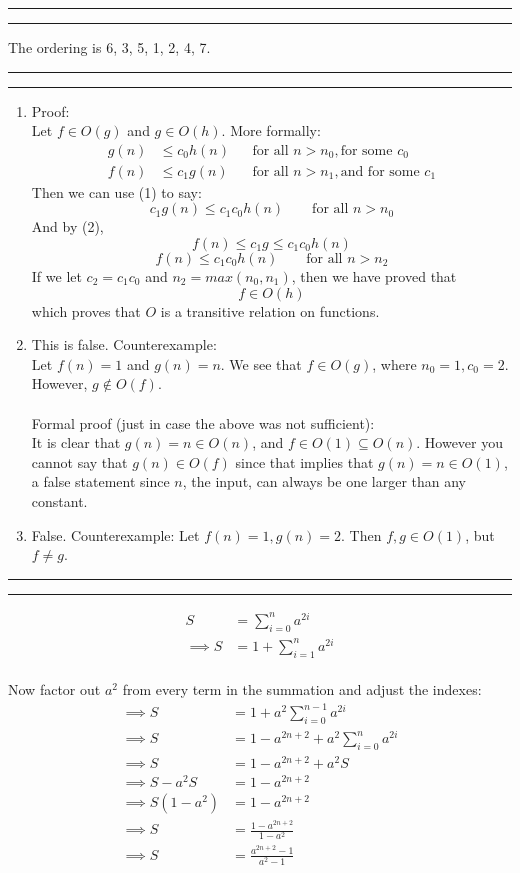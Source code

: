 \documentclass[11pt,letterpaper]{article}
\newcommand{\question}[2] {\vspace{.25in} \hrule\vspace{0.5em}
\noindent{\bf #1: #2} \vspace{0.5em}
\hrule \vspace{.10in}}
\begin{document}
%
%

\question{6}{Task 4.1}
The ordering is 6, 3, 5, 1, 2, 4, 7.

\question{7}{Task 4.2}
\begin{enumerate}
  \item
    Proof: \\
    Let $f \in O(g)$ and $g \in O(h)$. More formally:
    \begin{align}
      g(n) &\leq c_0 h(n) && \text{for all } n > n_0,\text{for some }c_0 \\
      f(n) &\leq c_1 g(n) && \text{for all } n > n_1,\text{and for some }c_1
    \end{align}
    Then we can use (1) to say:
    $$ c_1 g(n) \leq c_1 c_0 h(n) \qquad \text{for all }n > n_0 $$
    And by (2),
    $$ f(n) \leq c_1 g \leq c_1 c_0 h(n) $$
    $$ f(n) \leq c_1 c_0 h(n) \qquad \text{for all } n > n_2$$
    If we let $c_2 = c_1 c_0$ and $n_2 = max(n_0,n_1)$, then we have proved that 
    $$ f \in O(h)$$ which proves that $O$ is a transitive relation on functions.
  \item
    This is false. Counterexample:\\
    Let $f(n) = 1$ and $g(n) = n$. We see that $f \in O(g)$, where $n_0 = 1, c_0 = 2$.
    However, $g \notin O(f)$.\\
    \\
    Formal proof (just in case the above was not sufficient):\\
    It is clear that $g(n) = n \in O(n)$, and $f \in O(1) \subseteq O(n)$. However you cannot
    say that $g(n) \in O(f)$ since that implies that $g(n) = n \in O(1)$, a false statement since
    $n$, the input, can always be one larger than any constant.
  \item
    False. Counterexample: Let $ f(n) = 1, g(n) = 2$. Then $f,g \in O(1)$, but $f \neq g$.
\end{enumerate}

\question{8}{Task 4.3}
\begin{align*}
   S &= \sum_{i = 0}^{n} a^{2i}\\
  \implies  S &= 1 + \sum_{i = 1}^n a^{2i}
\end{align*}
\\
Now factor out $a^2$ from every term in the summation and adjust the indexes:
\begin{align*}
  \implies  S  &= 1 + a^{2} \sum_{i = 0}^{n-1} a^{2i}\\
  \implies  S &= 1 - a^{2n+2} + a^{2}  \sum_{i = 0}^{n} a^{2i}\\
  \implies  S &= 1 - a^{2n+2} + a^{2}S\\
  \implies  S - a^{2} S &= 1 - a^{2n+2} \\
  \implies  S(1 - a^{2}) &= 1 - a^{2n+2} \\
  \implies  S &= \frac{1 - a^{2n+2}}{1 - a^{2}} \\
  \implies  S &= \frac{a^{2n+2} - 1}{a^{2}-1}
\end{align*}
\end{document}
